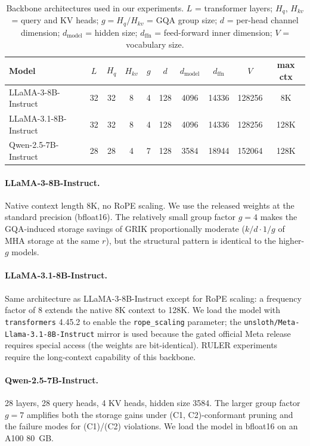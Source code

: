 \documentclass{article}
\begin{document}
\begin{table}[h]
\centering
\small
\setlength{\tabcolsep}{6pt}
\renewcommand{\arraystretch}{1.10}
\caption{Backbone architectures used in our experiments. $L$ = transformer layers; $H_q$, $H_{kv}$ = query and KV heads; $g = H_q / H_{kv}$ = GQA group size; $d$ = per-head channel dimension; $d_{\text{model}}$ = hidden size; $d_{\text{ffn}}$ = feed-forward inner dimension; $V$ = vocabulary size.}
\label{tab:backbone-specs}
\begin{tabular}{@{}l c c c c c c c c c@{}}
\toprule
\textbf{Model} & $L$ & $H_q$ & $H_{kv}$ & $g$ & $d$ & $d_{\text{model}}$ & $d_{\text{ffn}}$ & $V$ & \textbf{max ctx} \\
\midrule
LLaMA-3-8B-Instruct        & 32 & 32 &  8 & 4 & 128 & 4096 & 14336 & 128256 &  8K \\
LLaMA-3.1-8B-Instruct      & 32 & 32 &  8 & 4 & 128 & 4096 & 14336 & 128256 & 128K \\
Qwen-2.5-7B-Instruct       & 28 & 28 &  4 & 7 & 128 & 3584 & 18944 & 152064 & 128K \\
\bottomrule
\end{tabular}
\end{table}
 
\paragraph{LLaMA-3-8B-Instruct.} Native context length 8K, no RoPE scaling. We use the released weights at the standard precision (bfloat16). The relatively small group factor $g=4$ makes the GQA-induced storage savings of GRIK proportionally moderate ($k/d \cdot 1/g$ of MHA storage at the same $r$), but the structural pattern is identical to the higher-$g$ models.
 
\paragraph{LLaMA-3.1-8B-Instruct.} Same architecture as LLaMA-3-8B-Instruct except for RoPE scaling: a frequency factor of 8 extends the native 8K context to 128K. We load the model with \texttt{transformers} 4.45.2 to enable the \texttt{rope\_scaling} parameter; the \texttt{unsloth/Meta-Llama-3.1-8B-Instruct} mirror is used because the gated official Meta release requires special access (the weights are bit-identical). RULER experiments require the long-context capability of this backbone.
 
\paragraph{Qwen-2.5-7B-Instruct.} 28 layers, 28 query heads, 4 KV heads, hidden size 3584. The larger group factor $g=7$ amplifies both the storage gains under (C1, C2)-conformant pruning and the failure modes for (C1)/(C2) violations. We load the model in bfloat16 on an A100 80~GB.
 
\end{document}
